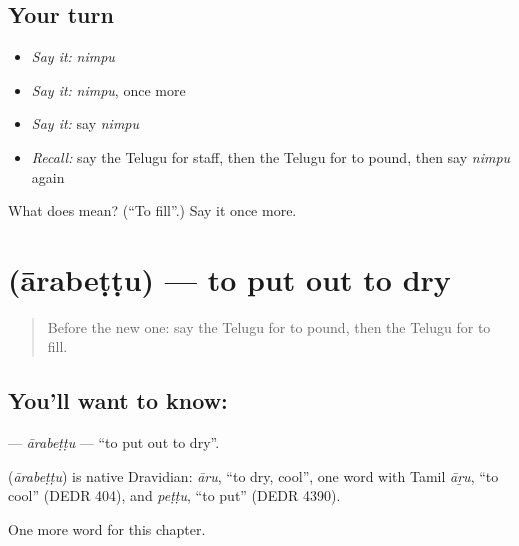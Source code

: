 \subsection*{Your turn}
\begin{itemize}
\raggedright
  \item \emph{Say it:} \emph{nimpu}
  \item \emph{Say it:} \emph{nimpu}, once more
  \item \emph{Say it:} say \emph{nimpu}
  \item \emph{Recall:} say the Telugu for staff, then the Telugu for to pound, then say \emph{nimpu} again
\end{itemize}

\begin{tcolorbox}[breakable,colback=teal!4,colframe=teal!35!black,title={Before you move on}]
What does  mean? (\textquotedblleft{}To fill\textquotedblright{}.) Say it once more.
\end{tcolorbox}
\section[\texorpdfstring{\te{ఆరబెట్టు} (ārabeṭṭu)}{ఆరబెట్టు (ārabeṭṭu)}]{ (ārabeṭṭu) — to put out to dry}

\label{lesson:TE-C199-arabettu}



\begin{quote}
Before the new one: say the Telugu for to pound, then the Telugu for to fill.
\end{quote}

\subsection*{You'll want to know: }
\textbf{} — \emph{ārabeṭṭu} — \textquotedblleft{}to put out to dry\textquotedblright{}.

\begin{cousinweb}
\textbf{} (\emph{ārabeṭṭu}) is native Dravidian: \emph{āru}, \textquotedblleft{}to dry, cool\textquotedblright{}, one word with Tamil \emph{āṟu}, \textquotedblleft{}to cool\textquotedblright{} (DEDR 404), and \emph{peṭṭu}, \textquotedblleft{}to put\textquotedblright{} (DEDR 4390).
\end{cousinweb}

\begin{grammarlens}[title={What you've built}]
One more word for this chapter.
\end{grammarlens}

